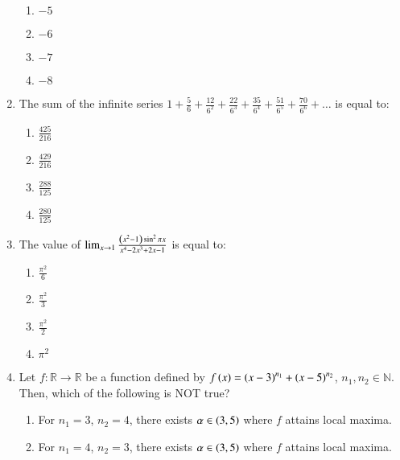 \documentclass[journal,12pt,onecolumn]{IEEEtran}
\theoremstyle{remark}
\begin{document}
\begin{enumerate}[start=1]
			\begin{enumerate}
				\item $-5$\\
				\item $-6$\\
				\item $-7$\\
				\item $-8$\\
			\end{enumerate}
	\item The sum of the infinite series $1+\frac{5}{6}+\frac{12}{6^2}+\frac{22}{6^3}+\frac{35}{6^4}+\frac{51}{6^5}+\frac{70}{6^6}+\dots$ is equal to:
		\begin{enumerate}
		\item $\frac{425}{216}$\\
		\item $\frac{429}{216}$\\
		\item $\frac{288}{125}$\\
		\item $\frac{280}{125}$\\
		\end{enumerate}
	\item The value of $\lim_{x\to 1}\frac{\left(x^2-1\right)\sin^2{\pi x}}{x^4-2x^3+2x-1}$ is equal to:
		\begin{enumerate}
			\item $\frac{{\pi}^2}{6}$\\
                        \item $\frac{{\pi}^2}{3}$\\
                        \item $\frac{{\pi}^2}{2}$\\
                        \item ${\pi}^2$\\
		\end{enumerate}
	\item Let $f:\mathbb{R}\to \mathbb{R}$ be a function defined by $f\left(x\right)={\left(x-3\right)}^{n_1}+{\left(x-5\right)}^{n_2}$, $n_1,n_2\in \mathbb{N}$. Then, which of the following is NOT true?
		\begin{enumerate}
			\item For $n_1=3$, $n_2=4$, there exists $\alpha\in\left(3,5\right)$ where $f$ attains local maxima.\\
                        \item For $n_1=4$, $n_2=3$, there exists $\alpha\in\left(3,5\right)$ where $f$ attains local maxima.\\

\end{enumerate}
\end{enumerate}
\end{document}
